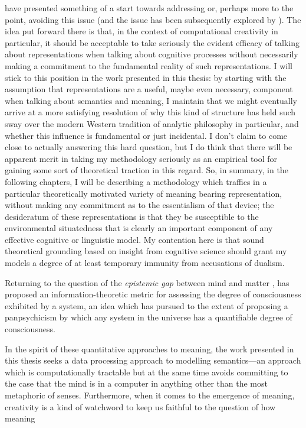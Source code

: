 \cite{McGregorEA2014} have presented something of a start towards addressing or, perhaps more to the point, avoiding this issue (and the issue has been subsequently explored by \cite{Coeckelbergh2016}).  The idea put forward there is that, in the context of computational creativity in particular, it should be acceptable to take seriously the evident efficacy of talking about representations when talking about cognitive processes without necessarily making a commitment to the fundamental reality of such representations.  I will stick to this position in the work presented in this thesis: by starting with the assumption that representations are a useful, maybe even necessary, component when talking about semantics and meaning, I maintain that we might eventually arrive at a more satisfying resolution of why this kind of structure has held such sway over the modern Western tradition of analytic philosophy in particular, and whether this influence is fundamental or just incidental.  I don't claim to come close to actually answering this hard question, but I do think that there will be apparent merit in taking my methodology seriously as an empirical tool for gaining some sort of theoretical traction in this regard.  So, in summary, in the following chapters, I will be describing a methodology which traffics in a particular theoretically motivated variety of meaning bearing representation, without making any commitment as to the essentialism of that device; the desideratum of these representations is that they be susceptible to the environmental situatedness that is clearly an important component of any effective cognitive or linguistic model.  My contention here is that sound theoretical grounding based on insight from cognitive science should grant my models a degree of at least temporary immunity from accusations of dualism.



Returning to the question of the \emph{epistemic gap} between mind and matter \citep{Levine,Pattee}, \cite{Tonnoni} has proposed an information-theoretic metric for assessing the degree of consciousness exhibited by a system, an idea which \cite{Koch} has pursued to the extent of proposing a panpsychicism by which any system in the universe has a quantifiable degree of consciousness.

In the spirit of these quantitative approaches to meaning, the work presented in this thesis seeks a data processing approach to modelling semantics---an approach which is computationally tractable but at the same time avoids committing to the case that the mind is in a computer in anything other than the most metaphoric of senses.  Furthermore,  when it comes to the emergence of meaning, creativity is a kind of watchword to keep us faithful to the question of how meaning 

